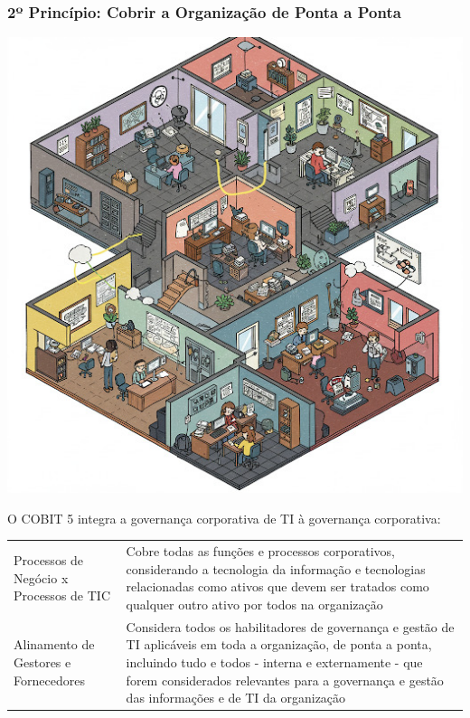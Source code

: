 \documentclass[
]{book}
\begin{document}
\subsubsection{2º Princípio: Cobrir a Organização de Ponta a Ponta}\label{uxba-princuxedpio-cobrir-a-organizauxe7uxe3o-de-ponta-a-ponta}

\includegraphics{images/cobit/04-principio-02-cobit.jpg}

O COBIT 5 integra a governança corporativa de TI à governança corporativa:

\begin{longtable}[]{@{}
  >{\raggedright\arraybackslash}p{}
  >{\raggedright\arraybackslash}p{}@{}}
\toprule\noalign{}
\endhead
\bottomrule\noalign{}
\endlastfoot
Processos de Negócio x Processos de TIC & Cobre todas as funções e processos corporativos, considerando a tecnologia da informação e tecnologias relacionadas como ativos que devem ser tratados como qualquer outro ativo por todos na organização \\
Alinamento de Gestores e Fornecedores & Considera todos os habilitadores de governança e gestão de TI aplicáveis em toda a organização, de ponta a ponta, incluindo tudo e todos - interna e externamente - que forem considerados relevantes para a governança e gestão das informações e de TI da organização \\
\end{longtable}
\end{document}
